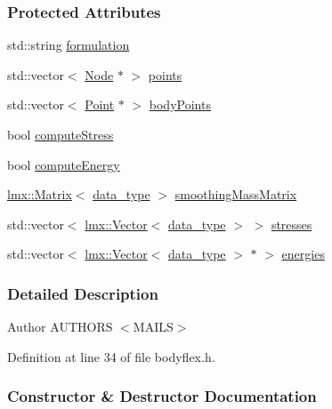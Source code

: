 \subsubsection*{Protected Attributes}
\begin{DoxyCompactItemize}
\item 
std\+::string \hyperlink{classmknix_1_1_flex_body_acb6f1ed2a9f207ceb39d485aabc2fbcf}{formulation}
\item 
std\+::vector$<$ \hyperlink{classmknix_1_1_node}{Node} $\ast$ $>$ \hyperlink{classmknix_1_1_flex_body_a6805771d1303a0ecde2d804d93f59575}{points}
\item 
std\+::vector$<$ \hyperlink{classmknix_1_1_point}{Point} $\ast$ $>$ \hyperlink{classmknix_1_1_flex_body_a2471c30701defa7d1947fa7457c923cd}{body\+Points}
\item 
bool \hyperlink{classmknix_1_1_flex_body_aaacb11b0809c01edca2c7ef4ea41de7a}{compute\+Stress}
\item 
bool \hyperlink{classmknix_1_1_flex_body_a653efdbfbf4f6ec147407a1c7ffb3779}{compute\+Energy}
\item 
\hyperlink{classlmx_1_1_matrix}{lmx\+::\+Matrix}$<$ \hyperlink{namespacemknix_a16be4b246fbf2cceb141e3a179111020}{data\+\_\+type} $>$ \hyperlink{classmknix_1_1_flex_body_a39cbb448870d5dee6fcc02362bec9940}{smoothing\+Mass\+Matrix}
\item 
std\+::vector$<$ \hyperlink{classlmx_1_1_vector}{lmx\+::\+Vector}$<$ \hyperlink{namespacemknix_a16be4b246fbf2cceb141e3a179111020}{data\+\_\+type} $>$ $>$ \hyperlink{classmknix_1_1_flex_body_aa3ee6a81c465127e810ec9cec2f3ab58}{stresses}
\item 
std\+::vector$<$ \hyperlink{classlmx_1_1_vector}{lmx\+::\+Vector}$<$ \hyperlink{namespacemknix_a16be4b246fbf2cceb141e3a179111020}{data\+\_\+type} $>$ $\ast$ $>$ \hyperlink{classmknix_1_1_flex_body_a1e6af3de339ebfd54b79e11827121622}{energies}
\end{DoxyCompactItemize}


\subsubsection{Detailed Description}
\begin{DoxyAuthor}{Author}
A\+U\+T\+H\+O\+R\+S $<$\+M\+A\+I\+L\+S$>$ 
\end{DoxyAuthor}


Definition at line 34 of file bodyflex.\+h.



\subsubsection{Constructor \& Destructor Documentation}
\hypertarget{classmknix_1_1_flex_body_a55ee3660c2f8d174e938972de2e62d36}{}
